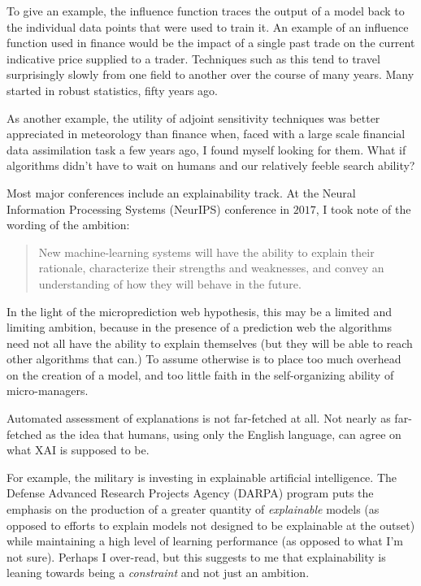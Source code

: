 To give an example, the influence function traces the output of a model back to the individual data points that were used to train it. An example of an influence function used in finance would be the impact of a single past trade on the current indicative price supplied to a trader. Techniques such as this tend to travel surprisingly slowly from one field to another over the course of many years. Many started in robust statistics, fifty years ago. 

As another example, the utility of adjoint sensitivity techniques was better appreciated in meteorology than finance when, faced with a large scale financial data assimilation task a few years ago, I found myself looking for them. What if algorithms didn't have to wait on humans and our relatively feeble search ability?

Most major conferences include an explainability track. At the Neural Information Processing Systems (NeurIPS) conference in $2017$, I took note of the wording of the ambition:
\begin{quotation}
New machine-learning systems will have the ability to explain their rationale, characterize their strengths and weaknesses, and convey an understanding of how they will behave in the future. 
\end{quotation}
In the light of the microprediction web hypothesis, this may be a limited and limiting ambition, because in the presence of a prediction web the algorithms need not all have the ability to explain themselves (but they will be able to reach other algorithms that can.) To assume otherwise is to place too much overhead on the creation of a model, and too little faith in the self-organizing ability of micro-managers. 

Automated assessment of explanations is not far-fetched at all. Not nearly as far-fetched as the idea that humans, using only the English language, can agree on what XAI is supposed to be. 

For example, the military is investing in explainable artificial intelligence. The Defense Advanced Research Projects Agency (DARPA) program puts the emphasis on the production of a greater quantity of {\em explainable} models (as opposed to efforts to explain models not designed to be explainable at the outset) while maintaining a high level of learning performance (as opposed to what I'm not sure). Perhaps I over-read, but this suggests to me that explainability is leaning towards being a {\em constraint} and not just an ambition. 

